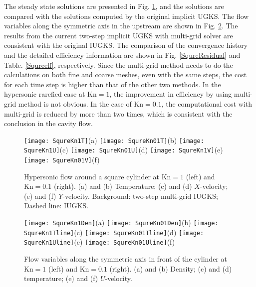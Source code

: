 \documentclass[3p,12pt]{elsarticle}
\begin{document}
	The steady state solutions are presented in Fig. \ref{Squre}, and the solutions are compared with the solutions computed by the original implicit UGKS. The flow variables along the symmetric axis in the upstream are shown in Fig. \ref{Squreline}. The results from the current two-step implicit UGKS with multi-grid solver are consistent with the original IUGKS. The comparison of the convergence history and the detailed efficiency information are shown in Fig. \ref{SqureResidual} and Table. \ref{Squreeff}, respectively. Since the multi-grid method needs to do the calculations
	on both fine and coarse meshes, even with the same steps, the cost for each time step is higher than that of the other two methods.
	In the hypersonic rarefied case at $\mathrm{Kn} = 1$, the improvement in efficiency by using multi-grid method is not obvious.  In the case of $\mathrm{Kn} = 0.1$, the computational cost with multi-grid is reduced by more than two times, which is consistent with the conclusion in the cavity flow.
	
	
	
	
	\begin{figure}
		\centering
		\texttt{[image: SqureKn1T]}{(a)}
		\texttt{[image: SqureKn01T]}{(b)}
		\texttt{[image: SqureKn1U]}{(c)}
		\texttt{[image: SqureKn01U]}{(d)}
		\texttt{[image: SqureKn1V]}{(e)}
		\texttt{[image: SqureKn01V]}{(f)}
		\caption{Hypersonic flow around a square cylinder at $\mathrm{Kn} = 1$ (left) and $\mathrm{Kn} = 0.1$ (right). (a) and (b) Temperature; (c) and (d) $X$-velocity; (e) and (f) $Y$-velocity. Background: two-step multi-grid IUGKS; Dashed line: IUGKS.}
		\label{Squre}
	\end{figure}
	
	\begin{figure}
		\centering
		\texttt{[image: SqureKn1Den]}{(a)}
		\texttt{[image: SqureKn01Den]}{(b)}
		\texttt{[image: SqureKn1Tline]}{(c)}
		\texttt{[image: SqureKn01Tline]}{(d)}
		\texttt{[image: SqureKn1Uline]}{(e)}
		\texttt{[image: SqureKn01Uline]}{(f)}
		\caption{Flow variables along the symmetric axis in front of the cylinder at $\mathrm{Kn} = 1$ (left) and $\mathrm{Kn} = 0.1$ (right). (a) and (b) Density; (c) and (d) temperature; (e) and (f) $U$-velocity.}
		\label{Squreline}
	\end{figure}
	
\end{document}
